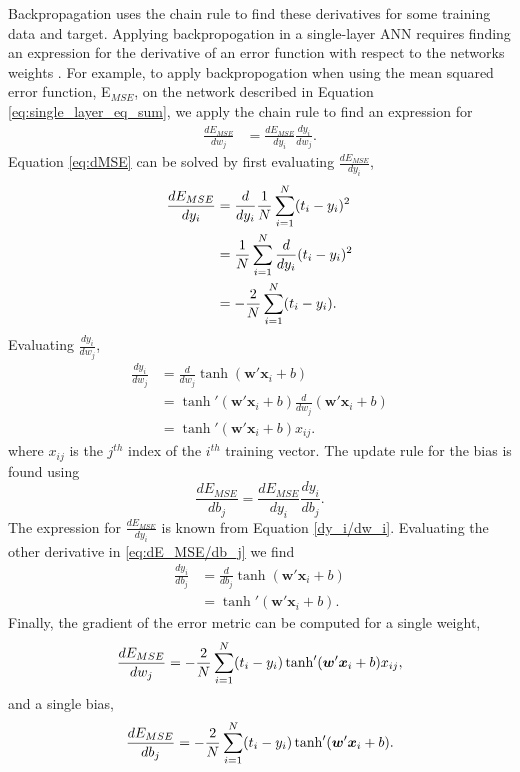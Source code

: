 Backpropagation uses the chain rule to find these derivatives for some training data and target. Applying backpropogation in a single-layer ANN requires finding an expression for the derivative of an error function with respect to the networks weights \cite{Nielsen2015}. For example, to apply backpropogation when using the mean squared error function, E$_{MSE}$, on the network described in Equation \ref{eq:single_layer_eq_sum}, we apply the chain rule to find an expression for
%
\begin{align} \label{eq:dMSE}
\frac{dE_{MSE}}{dw_j} &= \frac{dE_{MSE}}{dy_i} \frac{dy_i}{dw_j}.
\end{align}
%
Equation \ref{eq:dMSE} can be solved by first evaluating $\frac{dE_{MSE}}{dy_i}$,
%
\begin{align} \label{dE_{MSE}/dy_i}
\frac{dE_{MSE}}{dy_i}  &= \frac{d}{dy_i} \frac{1}{N} \sum_{i=1}^N(t_i - y_i)^2 \\
&= \frac{1}{N} \sum_{i=1}^N  \frac{d}{dy_i} (t_i - y_i)^2 \nonumber \\
&=  -\frac{2}{N} \sum_{i=1}^N  (t_i - y_i). \nonumber
\end{align}
%
Evaluating $\frac{dy_i}{dw_j}$,
%
\begin{align} \label{dy_i/dw_i}
\frac{dy_i}{dw_j}  &= \frac{d}{dw_j} \tanh( \boldsymbol{w}' \boldsymbol{x}_i + b) \\
&= \tanh'( \boldsymbol{w}' \boldsymbol{x}_i + b) \frac{d}{dw_j}( \boldsymbol{w}' \boldsymbol{x}_i + b) \nonumber \\
&= \tanh'( \boldsymbol{w}' \boldsymbol{x}_i + b)  x_{ij}. \nonumber
\end{align}
%
\noindent where $x_{ij}$ is the $j^{th}$ index of the $i^{th}$ training vector.
%
The update rule for the bias is found using
%
\begin{equation} \label{eq:dE_MSE/db_j}
\frac{dE_{MSE}}{db_j} = \frac{dE_{MSE}}{dy_i} \frac{dy_i}{db_j}.
\end{equation}
%
The expression for $\frac{dE_{MSE}}{dy_i}$ is known from Equation \ref{dy_i/dw_i}. Evaluating the other derivative in \ref{eq:dE_MSE/db_j} we find
%
\begin{align}
\frac{dy_i}{db_j} &= \frac{d}{db_j} \tanh(\boldsymbol{w}'\boldsymbol{x}_i + b) \\
 &= \tanh'( \boldsymbol{w}' \boldsymbol{x}_i + b). \nonumber
\end{align}
Finally, the gradient of the error metric can be computed for a single weight, 
%
\begin{equation} \label{eq:dE_{MSE}/dw_j_final}
\frac{dE_{MSE}}{dw_j} =  -\frac{2}{N} \sum_{i=1}^N  (t_i - y_i) \tanh'( \boldsymbol{w}' \boldsymbol{x}_i + b)  x_{ij},
\end{equation}
%
and a single bias,
%
\begin{equation} \label{eq:dE_{MSE}/db_j_final}
\frac{dE_{MSE}}{db_j} =  -\frac{2}{N} \sum_{i=1}^N  (t_i - y_i) \tanh'( \boldsymbol{w}' \boldsymbol{x}_i + b).
\end{equation}

